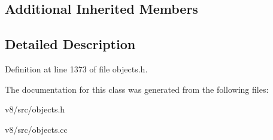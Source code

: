 \subsection*{Additional Inherited Members}


\subsection{Detailed Description}


Definition at line 1373 of file objects.\+h.



The documentation for this class was generated from the following files\+:\begin{DoxyCompactItemize}
\item 
v8/src/objects.\+h\item 
v8/src/objects.\+cc\end{DoxyCompactItemize}
